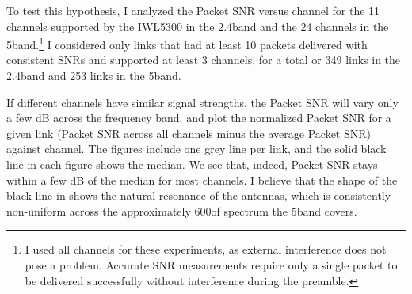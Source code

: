 To test this hypothesis, I analyzed the Packet SNR versus channel for the 11 channels supported by the IWL5300 in the 2.4\GHz band and the 24 channels in the 5\GHz band.\footnote{I used all channels for these experiments, as external interference does not pose a problem. Accurate SNR measurements require only a single packet to be delivered successfully without interference during the preamble.} I considered only links that had at least 10 packets delivered with consistent SNRs and supported at least 3 channels, for a total or 349 links in the 2.4\GHz band and 253 links in the 5\GHz band.

If different channels have similar signal strengths, the Packet SNR will vary only a few dB across the frequency band.  and  plot the normalized Packet SNR for a given link (Packet SNR across all channels minus the average Packet SNR) against channel. The figures include one grey line per link, and the solid black line in each figure shows the median. We see that, indeed, Packet SNR stays within a few dB of the median for most channels. I believe that the shape of the black line in  shows the natural resonance of the antennas, which is consistently non-uniform across the approximately 600\MHz of spectrum the 5\GHz band covers.

